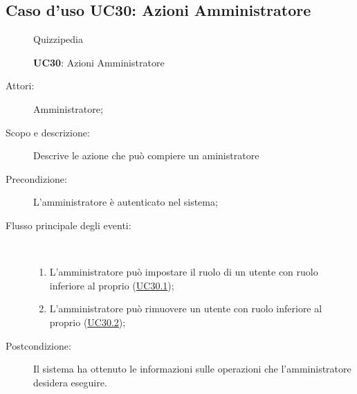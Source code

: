 \subsection{Caso d'uso UC30: Azioni Amministratore}
\begin{figure}[H]
	\centering
	\begin{resizedtikzpicture}{\textwidth}
		\begin{umlsystem}[x=0, fill=lightgray!20]{Quizzipedia}
		\end{umlsystem}
	\end{resizedtikzpicture}
	\caption{\textbf{UC30}: Azioni Amministratore}
	\label{UC30}
\end{figure}
\begin{description}
	\item[Attori:] Amministratore;
	\item[Scopo e descrizione:] Descrive le azione che può compiere un aministratore
	\item[Precondizione:] L'amministratore è autenticato nel sistema;
	
	\item[Flusso principale degli eventi:] \ 
	\begin{enumerate}
		\item L'amministratore può impostare il ruolo di un utente con ruolo inferiore al proprio (\hyperlink{UC30.1}{UC30.1});
		\item L'amministratore può rimuovere un utente con ruolo inferiore al proprio (\hyperlink{UC30.2}{UC30.2});
		
	\end{enumerate}
	\item[Postcondizione:] Il sistema ha ottenuto le informazioni sulle operazioni che l’amministratore desidera eseguire.
\end{description}
\hypertarget{UC30.1}{}
